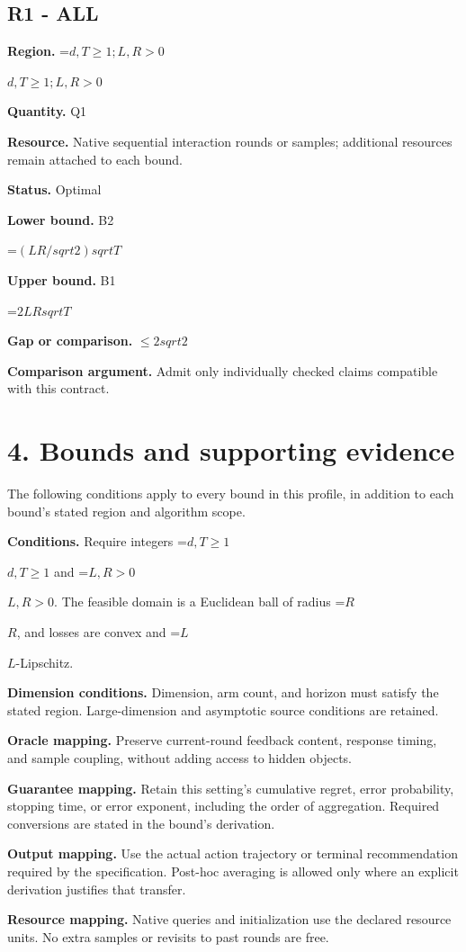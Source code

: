 \documentclass[10pt,a4paper]{article}
\newcommand{\AtlasMath}[1]{\par\begingroup\centering\setbox0=\hbox{$\displaystyle #1$}\ifdim\wd0>1.4\linewidth\typeout{ATLAS WIDE FORMULA: \the\wd0}\fi\ifdim\wd0>\linewidth\resizebox{\linewidth}{!}{\box0}\else\box0\fi\par\endgroup}
\newcommand{\AtlasInlineMath}[1]{\begingroup\setbox0=\hbox{$#1$}\ifdim\wd0>.4\linewidth\endgroup\AtlasMath{#1}\else\endgroup$#1$\fi}
\begin{document}
\subsection{R1 - ALL}
\textbf{Region.} \AtlasInlineMath{d,T\ge 1; L,R>0}

\textbf{Quantity.} Q1

\textbf{Resource.} Native sequential interaction rounds or samples; additional resources remain attached to each bound.

\textbf{Status.} Optimal

\textbf{Lower bound.} B2

\AtlasMath{(LR/sqrt2)sqrtT}
\textbf{Upper bound.} B1

\AtlasMath{2LRsqrtT}
\textbf{Gap or comparison.} $\le 2sqrt2$

\textbf{Comparison argument.} Admit only individually checked claims compatible with this contract.

\section{4. Bounds and supporting evidence}
The following conditions apply to every bound in this profile, in addition to each bound's stated region and algorithm scope.

\textbf{Conditions.} Require integers \AtlasInlineMath{d,T\ge1} and \AtlasInlineMath{L,R>0}. The feasible domain is a Euclidean ball of radius \AtlasInlineMath{R}, and losses are convex and \AtlasInlineMath{L}-Lipschitz.

\textbf{Dimension conditions.} Dimension, arm count, and horizon must satisfy the stated region. Large-dimension and asymptotic source conditions are retained.

\textbf{Oracle mapping.} Preserve current-round feedback content, response timing, and sample coupling, without adding access to hidden objects.

\textbf{Guarantee mapping.} Retain this setting's cumulative regret, error probability, stopping time, or error exponent, including the order of aggregation. Required conversions are stated in the bound's derivation.

\textbf{Output mapping.} Use the actual action trajectory or terminal recommendation required by the specification. Post-hoc averaging is allowed only where an explicit derivation justifies that transfer.

\textbf{Resource mapping.} Native queries and initialization use the declared resource units. No extra samples or revisits to past rounds are free.
\end{document}
